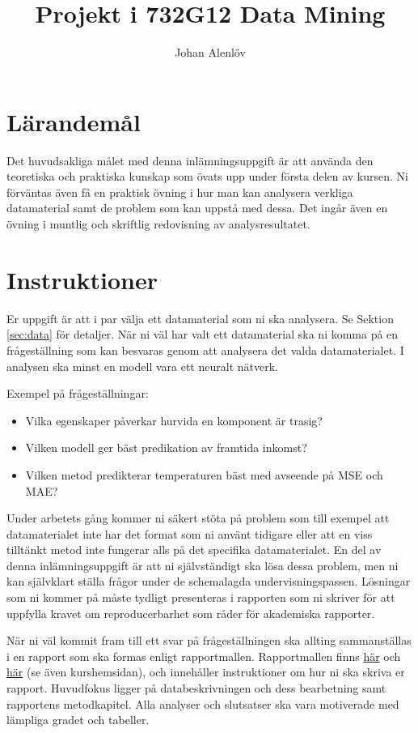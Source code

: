 \documentclass[a4paper]{article}
\title{Projekt i 732G12 Data Mining}
\author{Johan Alenlöv}
\begin{document}
\maketitle
\thispagestyle{fancy}


\section{Lärandemål}

Det huvudsakliga målet med denna inlämningsuppgift är att använda den teoretiska och praktiska kunskap som övats upp under första delen av kursen. Ni förväntas även få en praktisk övning i hur man kan analysera verkliga datamaterial samt de problem som kan uppstå med dessa. Det ingår även en övning i muntlig och skriftlig redovisning av analysresultatet.

\section{Instruktioner}

Er uppgift är att i par välja ett datamaterial som ni ska analysera. Se Sektion \ref{sec:data} för detaljer. När ni väl har valt ett datamaterial ska ni komma på en frågeställning som kan besvaras genom att analysera det valda datamaterialet. I analysen ska minst en modell vara ett neuralt nätverk.

Exempel på frågeställningar:
\begin{itemize}
    \item Vilka egenskaper påverkar hurvida en komponent är trasig? 
    \item Vilken modell ger bäst predikation av framtida inkomst?
    \item Vilken metod predikterar temperaturen bäst med avseende på MSE och MAE?
\end{itemize}
Under arbetets gång kommer ni säkert stöta på problem som till exempel att datamaterialet inte har det format som ni använt tidigare eller att en viss tilltänkt metod inte fungerar alls på det specifika datamaterialet. En del av denna inlämningsuppgift är att ni självständigt ska lösa dessa problem, men ni kan självklart ställa frågor under de schemalagda undervisningspassen. Lösningar som ni kommer på måste tydligt presenteras i rapporten som ni skriver för att uppfylla kravet om reproducerbarhet som råder för akademiska rapporter.

När ni väl kommit fram till ett svar på frågeställningen ska allting sammanställas i en rapport som ska formas enligt rapportmallen. Rapportmallen finns \href{https://raw.githubusercontent.com/STIMALiU/732G12_DM/master/project/template/Rapportmall STIMA projekt.rmd}{här} och \href{https://raw.githubusercontent.com/STIMALiU/732G12_DM/master/project/template/Rapportmall-STIMA-projekt.pdf}{här} (se även kurshemsidan), och innehåller instruktioner om hur ni ska skriva er rapport. Huvudfokus ligger på databeskrivningen och dess bearbetning samt rapportens metodkapitel. Alla analyser och slutsatser ska vara motiverade med lämpliga gradet och tabeller.
\end{document}

